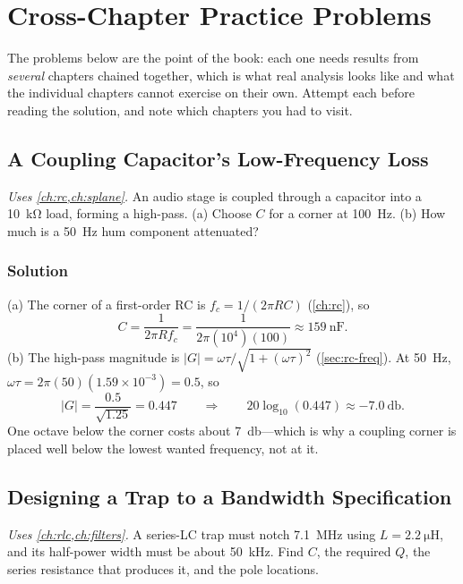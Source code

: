 \chapter{Cross-Chapter Practice Problems}
\label{ch:crossproblems}
The problems below are the point of the book: each one needs results from
\emph{several} chapters chained together, which is what real analysis looks like and
what the individual chapters cannot exercise on their own. Attempt each before reading
the solution, and note which chapters you had to visit.

\section{A Coupling Capacitor's Low-Frequency Loss}
\emph{Uses \cref{ch:rc,ch:splane}.} An audio stage is coupled through a capacitor into
a \SI{10}{\kilo\ohm} load, forming a high-pass. (a) Choose \(C\) for a corner at
\SI{100}{\hertz}. (b) How much is a \SI{50}{\hertz} hum component attenuated?

\subsection*{Solution}
(a) The corner of a first-order RC is \(f_c=1/(2\pi RC)\)
(\cref{ch:rc}), so
\[
C=\frac{1}{2\pi R f_c}=\frac{1}{2\pi(10^4)(100)}\approx\SI{159}{\nano\farad}.
\]
(b) The high-pass magnitude is \(|G|=\omega\tau/\sqrt{1+(\omega\tau)^2}\)
(\cref{sec:rc-freq}). At \SI{50}{\hertz}, \(\omega\tau=2\pi(50)(1.59\times10^{-3})=0.5\), so
\[
|G|=\frac{0.5}{\sqrt{1.25}}=0.447
\qquad\Longrightarrow\qquad
20\log_{10}(0.447)\approx-\SI{7.0}{\decibel}.
\]
One octave below the corner costs about \SI{7}{\decibel}---which is why a coupling
corner is placed well below the lowest wanted frequency, not at it.

\section{Designing a Trap to a Bandwidth Specification}
\emph{Uses \cref{ch:rlc,ch:filters}.} A series-LC trap must notch
\SI{7.1}{\mega\hertz} using \(L=\SI{2.2}{\micro\henry}\), and its half-power width
must be about \SI{50}{\kilo\hertz}. Find \(C\), the required \(Q\), the series
resistance that produces it, and the pole locations.

